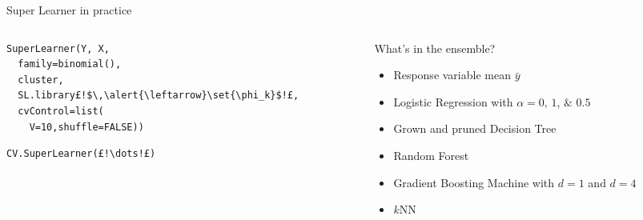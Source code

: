 \begin{frame}[fragile]{Super Learner in practice}


\begin{columns}[T]
\begin{column}{0.5\textwidth}
\begin{lstlisting}
SuperLearner(Y, X,
  family=binomial(),
  cluster,
  SL.library£!$\,\alert{\leftarrow}\set{\phi_k}$!£,
  cvControl=list(
    V=10,shuffle=FALSE))
\end{lstlisting}

\begin{lstlisting}
CV.SuperLearner(£!\dots!£)
\end{lstlisting}

\end{column}
\begin{column}{0.5\textwidth}
\vspace{0.5em}What's in the ensemble?
	\begin{itemize}
		\item Response variable mean $\bar{y}$
		\item Logistic Regression with $\alpha=\numlist{0;1;0.5}$
		\item Grown and pruned Decision Tree
		\item Random Forest
		\item Gradient Boosting Machine with $d=1$ and $d=4$
		\item $k\text{NN}$
	\end{itemize}
\end{column}
\end{columns}

\end{frame}


%
%
		
